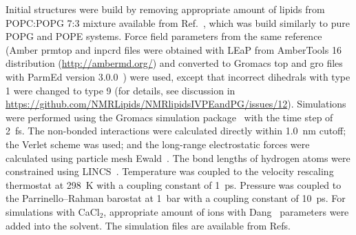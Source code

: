 \documentclass[journal=jpcbfk]{achemso}
\begin{document}
Initial structures were build by removing appropriate amount of lipids from POPC:POPG 7:3 mixture available from Ref.~,
which was build similarly to pure POPG and POPE systems.
Force field parameters from the same reference 
(Amber prmtop and inpcrd files were obtained with LEaP from AmberTools 16 distribution (\url{http://ambermd.org/})
and converted to Gromacs top and gro files with ParmEd version 3.0.0~\cite{shirts17})
were used, except that incorrect dihedrals with type 1 were changed to type 9
(for details, see discussion in \url{https://github.com/NMRLipids/NMRlipidsIVPEandPG/issues/12}).
Simulations were performed using the Gromacs simulation package~\cite{pall20} with the time step of 2~fs. 
The non-bonded interactions were calculated directly within 1.0~nm cutoff; the Verlet scheme was used\cite{Pall13};
and the long-range electrostatic forces were calculated using particle mesh Ewald~\cite{essman95}. 
The bond lengths of hydrogen atoms were constrained using LINCS~\cite{hess97}.
Temperature was coupled to the velocity rescaling thermostat \cite{bussi07} at 298~K with a coupling constant of 1~ps.
Pressure was coupled to the Parrinello--Rahman barostat \cite{parrinello81} at 1~bar with a coupling constant of 10~ps. 
For simulations with CaCl$_2$, appropriate amount of ions with Dang~\cite{smith94,dang06} parameters were added into the solvent.
The simulation files are available from
Refs.~
\end{document}
